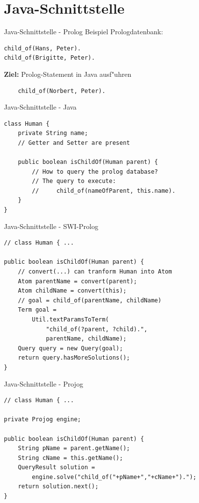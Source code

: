 \documentclass[18pt]{beamer}
\begin{document}
\section{Java-Schnittstelle}
\begin{frame}[fragile]{Java-Schnittstelle - Prolog}
Beispiel Prologdatenbank:
\begin{verbatim}
child_of(Hans, Peter).
child_of(Brigitte, Peter).
\end{verbatim}
\vspace{1cm}
\textbf{Ziel:} Prolog-Statement in Java ausf"uhren
\begin{verbatim}
    child_of(Norbert, Peter).
\end{verbatim}
\end{frame}
\begin{frame}[fragile]{Java-Schnittstelle - Java}
\begin{verbatim}
class Human {
    private String name;
    // Getter and Setter are present

    public boolean isChildOf(Human parent) {
        // How to query the prolog database?
        // The query to execute:
        //     child_of(nameOfParent, this.name).
    }	
}
\end{verbatim}
\end{frame}
\begin{frame}[fragile]{Java-Schnittstelle - SWI-Prolog}
\begin{verbatim}
// class Human { ...

public boolean isChildOf(Human parent) {
    // convert(...) can tranform Human into Atom
    Atom parentName = convert(parent);
    Atom childName = convert(this);
    // goal = child_of(parentName, childName)
    Term goal = 
        Util.textParamsToTerm(
            "child_of(?parent, ?child).", 
            parentName, childName);
    Query query = new Query(goal);
    return query.hasMoreSolutions();
}
\end{verbatim}
\end{frame}
\begin{frame}[fragile]{Java-Schnittstelle - Projog}
\begin{verbatim}
// class Human { ...

private Projog engine;

public boolean isChildOf(Human parent) {
    String pName = parent.getName();
    String cName = this.getName();
    QueryResult solution =
        engine.solve("child_of("+pName+","+cName+").");
    return solution.next();
}
\end{verbatim}
\end{frame}
\end{document}
